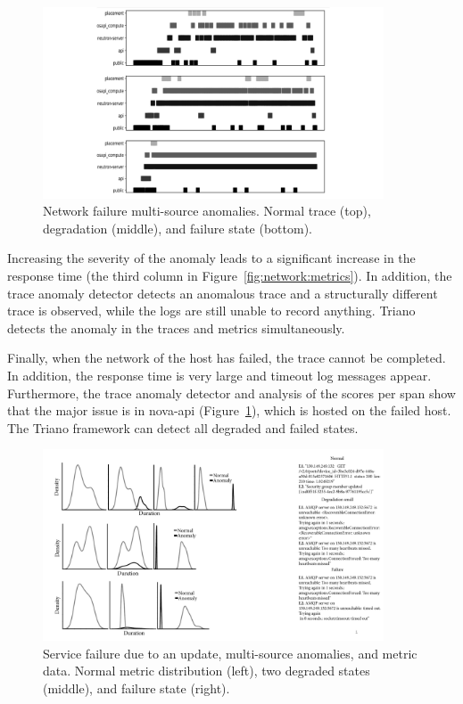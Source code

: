 \begin{figure}[!t]
\centerline{\includegraphics[width=0.9\textwidth]{gfx/chap7/tracesnetworkfailiure.pdf}}
\caption{Network failure multi-source anomalies. Normal trace (top), degradation (middle), and failure state (bottom).}
\label{fig:network:traces}
\end{figure}

Increasing the severity of the anomaly leads to a significant increase in the response time (the third column in Figure~\ref{fig:network:metrics}). In addition, the trace anomaly detector detects an anomalous trace and a structurally different trace is observed, while the logs are still unable to record anything. Triano detects the anomaly in the traces and metrics simultaneously. 

Finally, when the network of the host has failed, the trace cannot be completed. In addition, the response time is very large and timeout log messages appear. Furthermore, the trace anomaly detector and analysis of the scores per span show that the major issue is in nova-api (Figure~\ref{fig:network:traces}), which is hosted on the failed host. The Triano framework can detect all degraded and failed states. 



\begin{figure}[!b]
\centerline{\includegraphics[width=0.9\textwidth]{gfx/chap7/serviceupdatemetrics.pdf}}
\caption{Service failure due to an update, multi-source anomalies, and metric data. Normal metric distribution (left), two degraded states (middle), and failure state (right).}
\label{fig:callservice:metric}
\end{figure}


